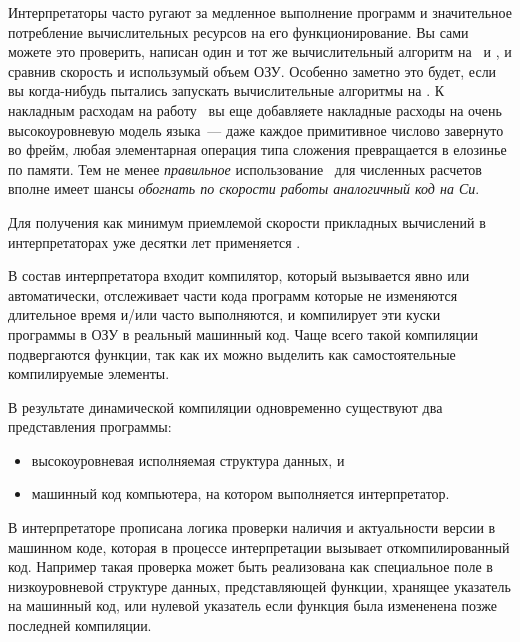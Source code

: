 \label{dyna}\secdown

Интерпретаторы часто ругают за медленное выполнение программ и значительное
потребление вычислительных ресурсов на его
функционирование. Вы сами можете это проверить, написан один и тот же
вычислительный алгоритм на \py{}\ и
\cpp, и сравнив скорость и использумый объем ОЗУ. Особенно заметно это будет,
если вы когда-нибудь пытались запускать вычислительные алгоритмы на \hico. К
накладным расходам на работу \py\ вы еще добавляете накладные расходы на очень
высокоуровневую модель языка\ --- даже каждое примитивное числово завернуто во
фрейм, любая элементарная операция типа сложения превращается в елозинье по
памяти. Тем не менее \emph{правильное} использование \hico\ для численных
расчетов вполне имеет шансы \textit{обогнать по скорости работы аналогичный код
на Си}.

Для получения как минимум приемлемой скорости прикладных вычислений в
интерпретаторах уже десятки лет применяется .

В состав интерпретатора входит компилятор, который вызывается явно или
автоматически, отслеживает части кода программ которые не изменяются длительное
время и/или часто выполняются, и компилирует эти куски программы в ОЗУ в
реальный машинный код. Чаще всего такой компиляции подвергаются функции, так
как их можно выделить как самостоятельные компилируемые элементы. 

В результате динамической компиляции одновременно существуют два представления
программы:
\begin{itemize}[nosep]
\item высокоуровневая исполняемая структура данных, и
\item машинный код компьютера, на котором выполняется интерпретатор.
\end{itemize}
В интерпретаторе прописана логика проверки наличия и актуальности версии в
машинном коде, которая в процессе интерпретации вызывает откомпилированный код.
Например такая проверка может быть реализована как специальное поле в
низкоуровневой структуре данных, представляющей функции, хранящее указатель на
машинный код, или нулевой указатель если функция была измененена позже последней
компиляции.




\secup
